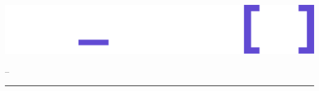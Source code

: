 \documentclass[10pt, brazil]{beamer}
\begin{document}
\begin{frame}[plain]
  \vspace{2em}
  \includegraphics[width=0.18\linewidth]{./assets/logos/for_code_para_fudo_escuro.png}

  \vfill
  \begin{center}
    {\inserttitle}

    \vspace{1em}
    {\textcolor{lightpurple}{\insertauthor – \insertdate}}
  \end{center}

  \vfill
  \begin{flushright}
    \textcolor{lightpurple}{\rule{0.3\linewidth}{3pt}}
  \end{flushright}
  
\end{frame}
\end{document}
